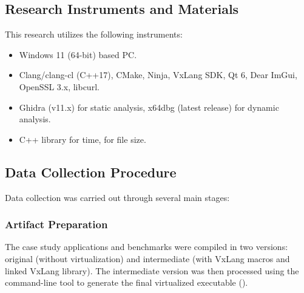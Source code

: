 \subsection{Research Instruments and Materials}
This research utilizes the following instruments:
\begin{itemize}
    \item {} Windows 11 (64-bit) based PC.
    \item {} Clang/clang-cl (C++17), CMake, Ninja, VxLang SDK, Qt 6, Dear ImGui, OpenSSL 3.x, libcurl.
    \item {} Ghidra (v11.x) for static analysis, x64dbg (latest release) for dynamic analysis.
    \item {} C++  library for time,  for file size.
\end{itemize}

\subsection{Data Collection Procedure}
Data collection was carried out through several main stages:

\subsubsection{Artifact Preparation}
The case study applications and benchmarks were compiled in two versions: original (without virtualization) and intermediate (with VxLang macros and linked VxLang library). The intermediate version was then processed using the  command-line tool to generate the final virtualized executable ().

